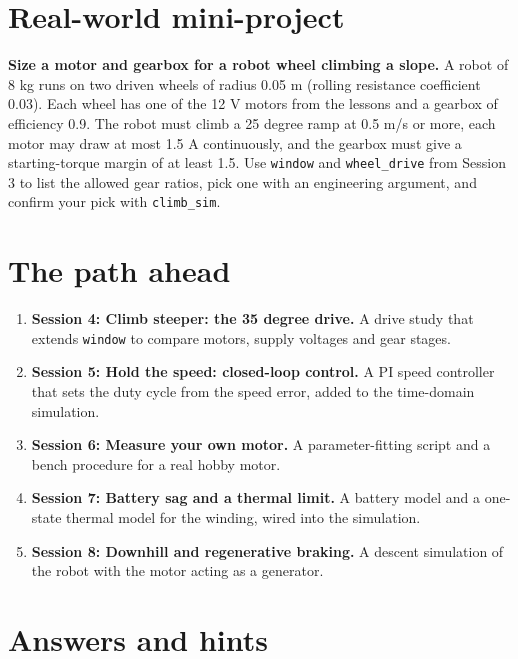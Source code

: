 \documentclass[11pt,a4paper]{article}
\begin{document}
\section{Real-world mini-project}
\textbf{Size a motor and gearbox for a robot wheel climbing a slope.} A robot of 8 kg runs on two driven wheels of radius 0.05 m (rolling resistance coefficient 0.03). Each wheel has one of the 12 V motors from the lessons and a gearbox of efficiency 0.9. The robot must climb a 25 degree ramp at 0.5 m/s or more, each motor may draw at most 1.5 A continuously, and the gearbox must give a starting-torque margin of at least 1.5. Use \texttt{window} and \texttt{wheel\_drive} from Session 3 to list the allowed gear ratios, pick one with an engineering argument, and confirm your pick with \texttt{climb\_sim}.

\section{The path ahead}
\begin{enumerate}[nosep]
\item \textbf{Session 4: Climb steeper: the 35 degree drive.} A drive study that extends \texttt{window} to compare motors, supply voltages and gear stages.
\item \textbf{Session 5: Hold the speed: closed-loop control.} A PI speed controller that sets the duty cycle from the speed error, added to the time-domain simulation.
\item \textbf{Session 6: Measure your own motor.} A parameter-fitting script and a bench procedure for a real hobby motor.
\item \textbf{Session 7: Battery sag and a thermal limit.} A battery model and a one-state thermal model for the winding, wired into the simulation.
\item \textbf{Session 8: Downhill and regenerative braking.} A descent simulation of the robot with the motor acting as a generator.
\end{enumerate}

\section{Answers and hints}
\end{document}
